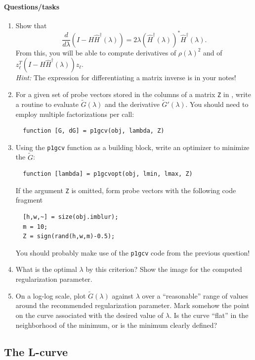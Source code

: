 \documentclass[12pt, leqno]{article} %
\begin{document}
\paragraph*{Questions/tasks}
\begin{enumerate}
\item
  Show that
  \[
    \frac{d}{d\lambda} \left( I-H \hat{H}^\dagger(\lambda) \right) =
    2\lambda( \hat{H}^\dagger(\lambda) )^* \hat{H}^\dagger(\lambda).
  \]
  From this, you will be able to compute derivatives of $\rho(\lambda)^2$
  and of $z_\ell^T (I-H \hat{H}^\dagger(\lambda)) z_{\ell}$. \\
  {\em Hint:} The expression for differentiating a matrix inverse
  is in your notes!
\item
  For a given set of probe vectors stored in the columns of a matrix
  {\tt Z} in \matlab, write a routine to evaluate $\tilde{G}(\lambda)$
  and the derivative $\tilde{G}'(\lambda)$.  You should need to employ
  multiple factorizations per call:
\begin{lstlisting}
  function [G, dG] = p1gcv(obj, lambda, Z)
\end{lstlisting}
\item
  Using the {\tt p1gcv} function as a building block, write an optimizer
  to minimize the $\tilde{G}$:
\begin{lstlisting}
  function [lambda] = p1gcvopt(obj, lmin, lmax, Z)
\end{lstlisting}
  If the argument {\tt Z} is omitted, form probe vectors with the following
  code fragment
\begin{lstlisting}
  [h,w,~] = size(obj.imblur);
  m = 10;
  Z = sign(rand(h,w,m)-0.5);
\end{lstlisting}
  You should probably make use of the {\tt p1gcv} code from the previous
  question!
\item
  What is the optimal $\lambda$ by this criterion?
  Show the image for the computed regularization parameter.
\item
  On a log-log scale, plot $\tilde{G}(\lambda)$ against $\lambda$ over
  a ``reasonable'' range of values around the recommended
  regularization parameter.  Mark somehow the point on the
  curve associated with the desired value of $\lambda$.  Is
  the curve ``flat'' in the neighborhood of the minimum, or
  is the minimum clearly defined?
\end{enumerate}

\subsection{The L-curve}
\end{document}
